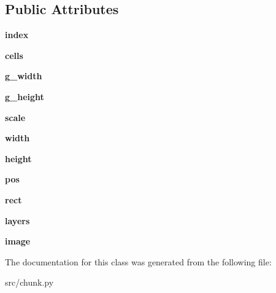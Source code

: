 \subsection*{\-Public \-Attributes}
\begin{DoxyCompactItemize}
\item 
\hypertarget{classsrc_1_1chunk_1_1_chunk_a82ce0dfa8735315e26aa9c2416a1990f}{{\bfseries index}}\label{classsrc_1_1chunk_1_1_chunk_a82ce0dfa8735315e26aa9c2416a1990f}

\item 
\hypertarget{classsrc_1_1chunk_1_1_chunk_ae7460fc09ed78a35073fcbee362fd632}{{\bfseries cells}}\label{classsrc_1_1chunk_1_1_chunk_ae7460fc09ed78a35073fcbee362fd632}

\item 
\hypertarget{classsrc_1_1chunk_1_1_chunk_aaa7585d6dbe7279632c09e63f01b1852}{{\bfseries g\-\_\-width}}\label{classsrc_1_1chunk_1_1_chunk_aaa7585d6dbe7279632c09e63f01b1852}

\item 
\hypertarget{classsrc_1_1chunk_1_1_chunk_a1983fca8cce8b602d5f913af22f560f3}{{\bfseries g\-\_\-height}}\label{classsrc_1_1chunk_1_1_chunk_a1983fca8cce8b602d5f913af22f560f3}

\item 
\hypertarget{classsrc_1_1chunk_1_1_chunk_a9d81d521c0c57301ed2b63947230cff1}{{\bfseries scale}}\label{classsrc_1_1chunk_1_1_chunk_a9d81d521c0c57301ed2b63947230cff1}

\item 
\hypertarget{classsrc_1_1chunk_1_1_chunk_a5e22e44a7517d38933823b944e467056}{{\bfseries width}}\label{classsrc_1_1chunk_1_1_chunk_a5e22e44a7517d38933823b944e467056}

\item 
\hypertarget{classsrc_1_1chunk_1_1_chunk_a6935c2e39e08c5d5855c87e5cc3fb624}{{\bfseries height}}\label{classsrc_1_1chunk_1_1_chunk_a6935c2e39e08c5d5855c87e5cc3fb624}

\item 
\hypertarget{classsrc_1_1chunk_1_1_chunk_a2d4bb7df9b98984ad3f37988d821dc04}{{\bfseries pos}}\label{classsrc_1_1chunk_1_1_chunk_a2d4bb7df9b98984ad3f37988d821dc04}

\item 
\hypertarget{classsrc_1_1chunk_1_1_chunk_a68ccf275540a2af3c9efcba15713b762}{{\bfseries rect}}\label{classsrc_1_1chunk_1_1_chunk_a68ccf275540a2af3c9efcba15713b762}

\item 
\hypertarget{classsrc_1_1chunk_1_1_chunk_a015e548635e3c3f6b43640852e24a609}{{\bfseries layers}}\label{classsrc_1_1chunk_1_1_chunk_a015e548635e3c3f6b43640852e24a609}

\item 
\hypertarget{classsrc_1_1chunk_1_1_chunk_a6044859819fd7699a93d453c52c16552}{{\bfseries image}}\label{classsrc_1_1chunk_1_1_chunk_a6044859819fd7699a93d453c52c16552}

\end{DoxyCompactItemize}


\-The documentation for this class was generated from the following file\-:\begin{DoxyCompactItemize}
\item 
src/chunk.\-py\end{DoxyCompactItemize}
